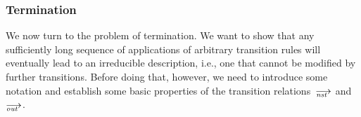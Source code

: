 


\subsubsection{Termination}

We now turn to the problem of termination.  We want to show that any
sufficiently long sequence of applications of arbitrary transition rules
will eventually lead to an irreducible description, i.e., one that cannot be
modified by further transitions.  Before doing that, however, we need to
introduce some notation and establish some basic properties of
the transition relations~$\nst$ and~$\out$.

